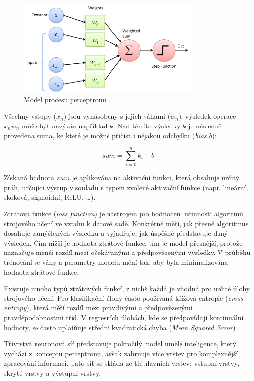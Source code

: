 \begin{figure}[H]
	\centering
	\includegraphics[width=0.8\textwidth]{obrazky-figures/perceptron.png}
	\caption{Model procesu perceptronu \cite{Perceptron}.}
\end{figure}

\noindent Všechny vstupy ($x_{n}$) jsou vynásobeny s jejich váhami ($w_{n}$), výsledek operace $x_{n}w_{n}$ může být nazýván například $k$. Nad těmito výsledky $k$  je následně provedena suma, ke které je možné přičíst i nějakou odchylku (\textit{bias} $b$): 

\[ sum = \sum_{i=0}^n k_i + b \]

Získaná hodnota $sum$ je aplikována na aktivační funkci, která obsahuje určitý práh, určující výstup v souladu s typem zvolené aktivační funkce (např. lineární, skoková, sigmoidní, ReLU, \dots). 

\bigskip

\noindent Ztrátová funkce \cite{LossFunctions} (\textit{loss function}) je nástrojem pro hodnocení účinnosti algoritmů strojového učení ve vztahu k datové sadě. Konkrétně měří, jak přesně algoritmus dosahuje zamýšlených výsledků a vyjadřuje, jak úspěšně představuje daný výsledek. Čím nižší je hodnota ztrátové funkce, tím je model přesnější, protože naznačuje menší rozdíl mezi očekávanými a předpovězenými výsledky. V průběhu trénování se váhy a parametry modelu mění tak, aby byla minimalizována hodnota ztrátové funkce.

Existuje mnoho typů ztrátových funkcí, z nichž každá je vhodná pro určité úlohy strojového učení. Pro klasifikační úlohy často používaná křížová entropie (\textit{cross-entropy}), která měří rozdíl mezi pravdivými a předpovězenými pravděpodobnostmi tříd. V regresních úlohách, kde se předpovídají kontinuální hodnoty, se často uplatňuje střední kvadratická chyba (\textit{Mean Squared Error}) \cite{LossFunctions}.

\bigskip

\noindent Třívrstvá neuronová síť představuje pokročilý model umělé inteligence, který vychází z~konceptu perceptronu, avšak zahrnuje více vrstev pro komplexnější zpracování informací. Tato síť se skládá ze tří hlavních vrstev: vstupní vrstvy, skryté vrstvy a výstupní vrstvy.

